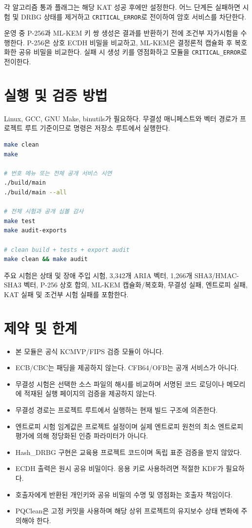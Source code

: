 \documentclass[11pt,a4paper]{article}
\begin{document}
각 알고리즘 통과 플래그는 해당 KAT 성공 후에만 설정한다. 어느 단계든
실패하면 시험 및 DRBG 상태를 제거하고 \texttt{CRITICAL\_ERROR}로 전이하여
암호 서비스를 차단한다.

운영 중 P-256과 ML-KEM 키 쌍 생성은 결과를 반환하기 전에 조건부 자가시험을
수행한다. P-256은 상호 ECDH 비밀을 비교하고, ML-KEM은 결정론적 캡슐화 후
복호화한 공유 비밀을 비교한다. 실패 시 생성 키를 영점화하고 모듈을
\texttt{CRITICAL\_ERROR}로 전이한다.

\section{실행 및 검증 방법}

Linux, GCC, GNU Make, binutils가 필요하다. 무결성 매니페스트와 벡터 경로가
프로젝트 루트 기준이므로 명령은 저장소 루트에서 실행한다.

\begin{lstlisting}[language=bash]
make clean
make

# 번호 메뉴 또는 전체 공개 서비스 시연
./build/main
./build/main --all

# 전체 시험과 공개 심볼 감사
make test
make audit-exports

# clean build + tests + export audit
make clean && make audit
\end{lstlisting}

주요 시험은 상태 및 장애 주입 시험, 3,342개 ARIA 벡터, 1,266개
SHA3/HMAC-SHA3 벡터, P-256 상호 합의, ML-KEM 캡슐화/복호화, 무결성 실패,
엔트로피 실패, KAT 실패 및 조건부 시험 실패를 포함한다.

\section{제약 및 한계}

\begin{itemize}
  \item 본 모듈은 공식 KCMVP/FIPS 검증 모듈이 아니다.
  \item ECB/CBC는 패딩을 제공하지 않는다. CFB64/OFB는 공개 서비스가 아니다.
  \item 무결성 시험은 선택한 소스 파일의 해시를 비교하며 서명된 코드 로딩이나
        메모리에 적재된 실행 페이지의 검증을 제공하지 않는다.
  \item 무결성 경로는 프로젝트 루트에서 실행하는 현재 빌드 구조에 의존한다.
  \item 엔트로피 시험 임계값은 프로젝트 설정이며 실제 엔트로피 원천의
        최소 엔트로피 평가에 의해 정당화된 인증 파라미터가 아니다.
  \item Hash\_DRBG 구현은 교육용 프로젝트 코드이며 독립 표준 검증을 받지 않았다.
  \item ECDH 출력은 원시 공유 비밀이다. 응용 키로 사용하려면 적절한 KDF가 필요하다.
  \item 호출자에게 반환된 개인키와 공유 비밀의 수명 및 영점화는 호출자 책임이다.
  \item PQClean은 고정 커밋을 사용하며 해당 상위 프로젝트의 유지보수 상태 변화에
        주의해야 한다.
\end{itemize}
\end{document}
